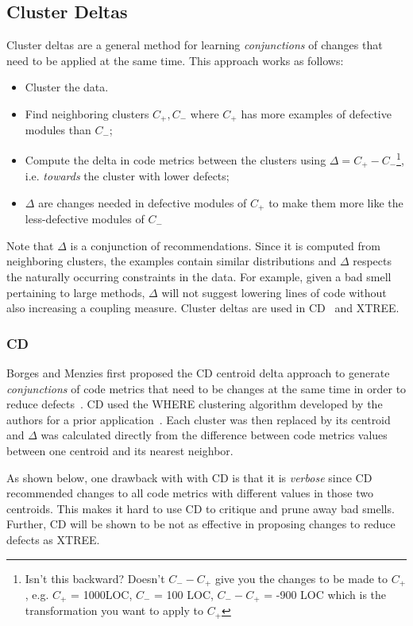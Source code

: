 \documentclass[twocolumn,5p]{elsarticle}
\theoremstyle{break}
\begin{document}
\subsection{Cluster Deltas}

Cluster deltas are a general method
for learning {\em conjunctions} of changes
that need to be applied at the same time. 
This approach works as follows:
\begin{itemize}
    \item Cluster the data. 
    \item Find
neighboring clusters $C_+,C_-$ where $C_+$ has more examples of defective
modules than $C_-$;
\item Compute the  delta   in code metrics between the clusters using \mbox{$\Delta = C_+ - C_-$}\footnote{Isn't this backward? Doesn't $C_- - C_+$ give you the changes to be made to $C_+$, e.g. $C_+$ = 1000LOC, $C_-$ = 100 LOC, $C_- - C_+$ = -900 LOC which is the transformation you want to apply to $C_+$}, i.e.
{\em towards} the cluster with lower defects;
\item $\Delta$ are changes needed in defective modules of $C_+$ to
      make them more like the less-defective modules of $C_-$
\end{itemize}
Note that $\Delta$ is a conjunction of  recommendations.
Since it is computed
from neighboring clusters, the examples contain similar distributions and $\Delta$ respects the naturally occurring constraints in the data. For example,
given a bad smell pertaining to large methods,   $\Delta$   will not  suggest lowering lines of code
without also increasing a coupling measure. 
Cluster deltas are used in CD~\cite{me12c} and XTREE.



\subsubsection{CD}\label{sec:cdcd}
Borges and Menzies first proposed the CD centroid delta approach to
generate {\em conjunctions} of code metrics
that need to be changes at the same time
in order to reduce defects~\cite{me12c}.
CD used the WHERE clustering algorithm developed by the
authors for a prior application~\cite{localvsglobal}.
Each cluster was then replaced by its centroid
and $\Delta$ was calculated directly from the difference
between code metrics values between one centroid
and its nearest neighbor.


As shown below, one drawback with with CD is that it is {\em verbose}
since
CD   recommended changes to all code
metrics with different values in those two centroids. 
This makes it hard to use CD to   critique and prune away bad smells. Further, CD will be shown to be
not as effective
in proposing changes to reduce defects as XTREE.
\end{document}
